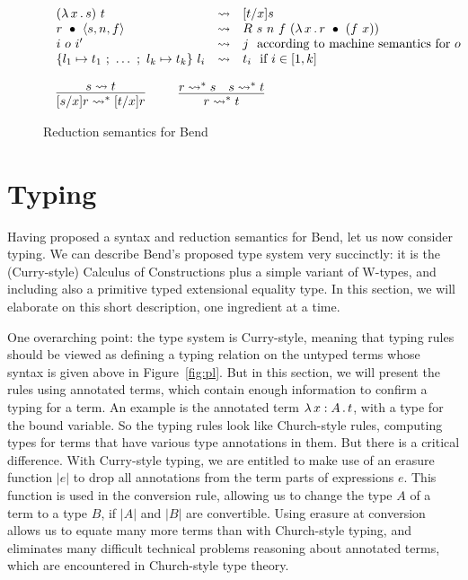 \documentclass{article}
\begin{document}
\begin{figure}
  \[
\begin{array}{l}
  \begin{array}{lll}
    (\lam{x}{s})\ t & \leadsto & [t/x]s \\
    \wrec{r}{\ctor{s}{n}{f}} & \leadsto & R\ s\ n\ f\ (\lam{x}{\wrec{r}{(f\ x)}}) \\
    i\ o\ i' & \leadsto & j\ \ \textnormal{according to machine semantics for }o \\
    \{ l_1 \mapsto t_1\ ;\ \ldots\ ;\ l_k\mapsto t_k \}\ l_i & \leadsto & t_i\ \ \textnormal{if } i\in[1,k]
  \end{array}
  \\ \\
  \begin{array}{lll}
  \infer{[s/x]r \leadsto^* [t/x]r}{s \leadsto t} &\ \ &
  \infer{r \leadsto^* t}{r \leadsto^* s & s \leadsto^* t}
  \end{array}
\end{array}  
\]
  \caption{Reduction semantics for Bend}
  \label{fig:opsem}
  \end{figure}

\section{Typing}
\label{sec:tp}

Having proposed a syntax and reduction semantics for Bend, let us now
consider typing.  We can describe Bend's proposed type system very
succinctly: it is the (Curry-style) Calculus of Constructions plus a
simple variant of W-types, and including also a primitive typed
extensional equality type.  In this section, we will elaborate on
this short description, one ingredient at a time.

One overarching point: the type system is Curry-style, meaning that
typing rules should be viewed as defining a typing relation on the
untyped terms whose syntax is given above in Figure~\ref{fig:pl}.  But
in this section, we will present the rules using annotated terms,
which contain enough information to confirm a typing for a term.  An
example is the annotated term $\lambda\, x : A\, .\, t$, with a type for the
bound variable.  So the typing rules look like Church-style rules,
computing types for terms that have various type annotations in them.
But there is a critical difference.  With Curry-style typing, we are
entitled to make use of an erasure function $|e|$ to drop all
annotations from the term parts of expressions $e$.  This function is
used in the conversion rule, allowing us to change the type $A$ of a
term to a type $B$, if $|A|$ and $|B|$ are convertible.  Using erasure
at conversion allows us to equate many more terms than with
Church-style typing, and eliminates many difficult technical problems
reasoning about annotated terms, which are encountered in Church-style
type theory.
\end{document}

